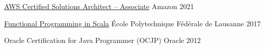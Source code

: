 





\begin{cventries}

  \cventry
    {\href{https://www.credly.com/badges/e5761b98-edf5-44ec-bb32-24f18672e7de/public_url}{AWS Certified Solutions Architect – Associate}}
    {\hspace{0.5em}Amazon} %
    {}
    {2021}
    {}
    {}
    
  \cventry
    {\href{https://www.coursera.org/account/accomplishments/specialization/9NNUCHVNV36F}{Functional Programming in Scala}}
    {\hspace{0.5em}École Polytechnique Fédérale de Lausanne} %
    {}
    {2017}
    {}
    {}
    
  \cventry
    {Oracle Certification for Java Programmer (OCJP)} %
    {\hspace{0.5em}Oracle} %
    {}
    {2012} %
    {}
    {}



\end{cventries}
